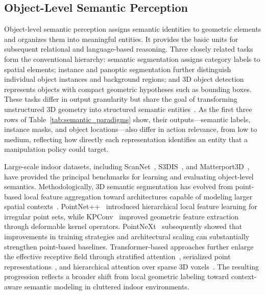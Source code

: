\documentclass{SCIS2026}
\begin{document}
\subsection{Object-Level Semantic Perception}

Object-level semantic perception assigns semantic identities to geometric elements and organizes them into meaningful entities. It provides the basic units for subsequent relational and language-based reasoning. Three closely related tasks form the conventional hierarchy: semantic segmentation assigns category labels to spatial elements; instance and panoptic segmentation further distinguish individual object instances and background regions; and 3D object detection represents objects with compact geometric hypotheses such as bounding boxes. These tasks differ in output granularity but share the goal of transforming unstructured 3D geometry into structured semantic entities~\cite{guo2020deep}. As the first three rows of Table~\ref{tab:semantic_paradigms} show, their outputs---semantic labels, instance masks, and object locations---also differ in action relevance, from low to medium, reflecting how directly each representation identifies an entity that a manipulation policy could target.

Large-scale indoor datasets, including ScanNet~\cite{dai2017scannet}, S3DIS~\cite{armeni2017joint}, and Matterport3D~\cite{chang2017matterport3d}, have provided the principal benchmarks for learning and evaluating object-level semantics. Methodologically, 3D semantic segmentation has evolved from point-based local feature aggregation toward architectures capable of modeling larger spatial contexts~\cite{choy20194d}. PointNet++~\cite{qi2017pointnet++} introduced hierarchical local feature learning for irregular point sets, while KPConv~\cite{thomas2019kpconv} improved geometric feature extraction through deformable kernel operators. PointNeXt~\cite{qian2022pointnext} subsequently showed that improvements in training strategies and architectural scaling can substantially strengthen point-based baselines. Transformer-based approaches further enlarge the effective receptive field through stratified attention~\cite{lai2022stratified}, serialized point representations~\cite{wu2024point}, and hierarchical attention over sparse 3D voxels~\cite{yang2025swin3d}. The resulting progression reflects a broader shift from local geometric labeling toward context-aware semantic modeling in cluttered indoor environments.
\end{document}
